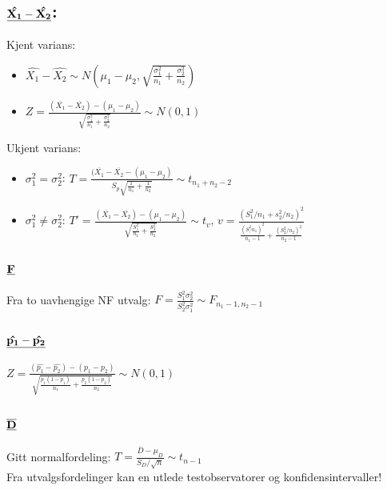 \documentclass[8pt,a4paper,twocolumn,twoside]{article}
\begin{document}
\subsection*{$\bold{\underline{\hat{X_1}-\hat{X_2}}}$:}
Kjent varians:
\begin{itemize}
    \item $\hat{X_1}-\hat{X_2} \sim N\left(\mu_1-\mu_2,\sqrt{\frac{\sigma_1^2}{n_1}+\frac{\sigma_2^2}{n_2}}\right)$
    \item $Z=\frac{(\overline{X_1}-\overline{X_2})-(\mu_1-\mu_2)}{\sqrt{\frac{\sigma^2_1}{n_1}+\frac{\sigma^2_2}{n_2}}}\sim N(0,1)$
\end{itemize}
Ukjent varians:
\begin{itemize}[topsep=0pt,itemsep=0pt, partopsep=0pt]
    \item $\sigma^2_1=\sigma^2_2$: $T=\frac{(\overline{X_1}-\overline{X_2}-(\mu_1-\mu_2)}{S_p\sqrt{\frac{1}{n_1}+\frac{1}{n_2}}}\sim t_{n_1+n_2-2}$
    \item $\sigma^2_1\neq\sigma^2_2$: $T'=\frac{(\overline{X_1}-\overline{X_2})-(\mu_1-\mu_2)}{\sqrt{\frac{S^2_1}{n_1}+\frac{S^2_2}{n_2}}}\sim t_v,\, v=\frac{(S^2_1/n_1+s^2_2/n_2)^2}{\frac{(S^2_/n_1)^2}{n_1-1}+\frac{(S^2_2/n_2)^2}{n_2-1}}$
\end{itemize}
\subsection*{$\bold{\underline{F}}$}
Fra to uavhengige NF utvalg:
$F=\frac{S^2_1\sigma^2_2}{S^2_2\sigma^2_1}\sim F_{n_1-1,n_2-1}$
\subsection*{$\bold{\underline{\hat{p_1}-\hat{p_2}}}$}
$Z=\frac{(\hat{p_1}-\hat{p_2})-(p_1-p_2)}{\sqrt{\frac{p_1(1-p_1)}{n_1}+\frac{p_2(1-p_2)}{n_2}}}\sim N(0,1)$
\subsection*{$\bold{\underline{\overline{D}}}$}
Gitt normalfordeling: $T=\frac{\overline{D}-\mu_D}{S_D/\sqrt{n}}\sim t_{n-1}$\\
Fra utvalgsfordelinger kan en utlede testobservatorer og konfidensintervaller!
%
%
\end{document}
